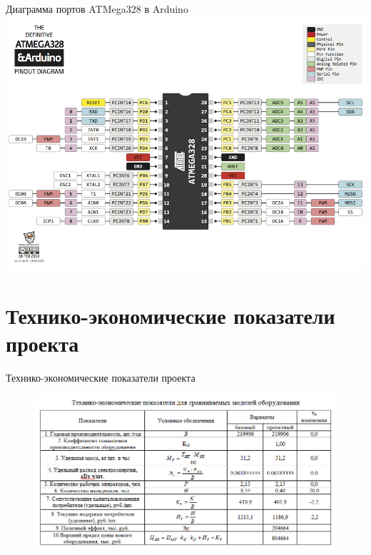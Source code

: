 \begin{frame}{Диаграмма портов ATMega328 в Arduino}
    \centering
    \includegraphics[width=1\linewidth]{../Figures/a328diagram.png}
\end{frame}

\section{Технико-экономические показатели проекта}

\begin{frame}{Технико-экономические показатели проекта}
    \centering
    \begin{figure}[ht]
        \includegraphics[width=1\linewidth]{Figures/econtable.png}
    \end{figure}
\end{frame}
